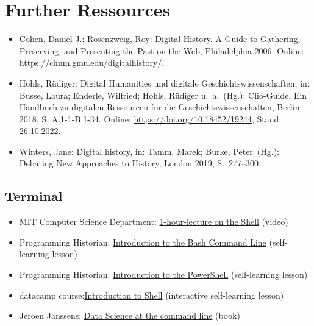 \documentclass[
  letterpaper,
]{book}
\begin{document}
\hypertarget{further-ressources}{%
\chapter{Further Ressources}\label{further-ressources}}

\begin{itemize}
\item
  Cohen, Daniel J.; Rosenzweig, Roy: Digital History. A Guide to
  Gathering, Preserving, and Presenting the Past on the Web,
  Philadelphia 2006. Online: https://chnm.gmu.edu/digitalhistory/.
\item
  Hohls, Rüdiger: Digital Humanities und digitale
  Geschichtswissenschaften, in: Busse, Laura; Enderle, Wilfried; Hohls,
  Rüdiger u.~a.~(Hg.): Clio-Guide. Ein Handbuch zu digitalen Ressourcen
  für die Geschichtswissenschaften, Berlin 2018, S. A.1-1-B.1-34.
  Online: \url{https://doi.org/10.18452/19244}, Stand: 26.10.2022.
\item
  Winters, Jane: Digital history, in: Tamm, Marek; Burke, Peter~(Hg.):
  Debating New Approaches to History, London 2019, S.~277--300.
\end{itemize}

\hypertarget{terminal}{%
\section{Terminal}\label{terminal}}

\begin{itemize}
\item
  MIT Computer Science Department:
  \href{https://missing.csail.mit.edu/2020/course-shell/}{1-hour-lecture
  on the Shell} (video)
\item
  Programming Historian:
  \href{https://programminghistorian.org/en/lessons/intro-to-bash}{Introduction
  to the Bash Command Line} (self-learning lesson)
\item
  Programming Historian:
  \href{https://programminghistorian.org/en/lessons/intro-to-powershell}{Introduction
  to the PowerShell} (self-learning lesson)
\item
  datacamp
  course:\href{https://app.datacamp.com/learn/courses/introduction-to-shell}{Introduction
  to Shell} (interactive self-learning lesson)
\item
  Jeroen Janssens: \href{https://datascienceatthecommandline.com/}{Data
  Science at the command line} (book)
\end{itemize}
\end{document}
